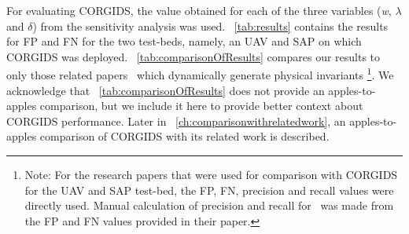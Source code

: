\begin{table}
\centering
  \caption{Comparison of Precision and Recall for OpenAPS platform}
  \label{tab:comparisonOfResults}
\end{table}

For evaluating \ac{CORGIDS}, the value obtained for each of the three variables (\textit{w}, $\lambda$ and $\delta$) from the sensitivity analysis was used. ~\autoref{tab:results} contains the results for \ac{FP} and \ac{FN} for the two test-beds, namely, an \ac{UAV} and \ac{SAP} on which \ac{CORGIDS} was deployed. ~\autoref{tab:comparisonOfResults} compares our results to only those related papers~\cite{chen2018learning,zohrevand2016hidden,aliabadi2017artinali} which dynamically generate physical invariants \footnote{Note: For the research papers that were used for comparison with \ac{CORGIDS} for the \ac{UAV} and \ac{SAP} test-bed, the \ac{FP}, \ac{FN}, precision and recall values were directly used. Manual calculation of precision and recall for~\cite{aliabadi2017artinali} was made from the \ac{FP} and \ac{FN} values provided in their paper.}. We acknowledge that ~\autoref{tab:comparisonOfResults} does not provide an apples-to-apples comparison, but we include it here to provide better context about \ac{CORGIDS} performance. Later in ~\autoref{ch:comparisonwithrelatedwork}, an apples-to-apples comparison of CORGIDS with its related work is described.

